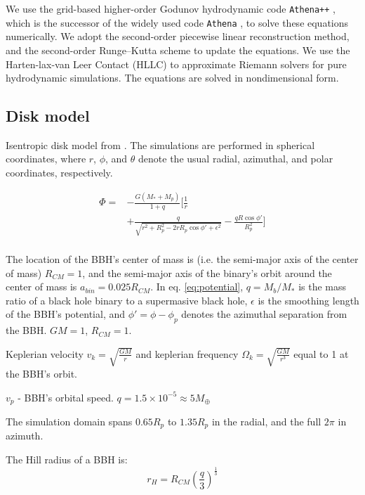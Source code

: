 \documentclass[twocolumn]{aastex631}
\begin{document}
We use the grid-based higher-order Godunov hydrodynamic code \texttt{Athena++} \citep{stone2020}, which is the successor of the 
widely used code \texttt{Athena} \citep{stone2008}, to solve these equations numerically. 
We adopt the second-order piecewise linear reconstruction method, and the second-order Runge–Kutta scheme to update the equations. 
We use the Harten-lax-van Leer Contact (HLLC) \citep{toro1994} to approximate Riemann solvers for pure hydrodynamic simulations. 
The equations are solved in nondimensional form. 

\subsection{Disk model}
Isentropic disk model from \citet{Fung_2017}.
The simulations are performed in spherical coordinates, where $r$, $\phi$, and $\theta$ denote the usual radial, azimuthal, and polar coordinates, respectively. 

\begin{equation}\label{eq:potential}
\begin{aligned}
     \Phi = & -\frac{G(M_*+M_p)}{1+q} \bigg[\frac{1}{r} \\
     & + \frac{q}{\sqrt{r^2+R_p^2-2rR_p\cos{\phi'}+\epsilon^2}} - \frac{qR\cos{\phi'}}{R_p^2}\bigg] \\
\end{aligned}
\end{equation}

The location of the BBH's center of mass is (i.e. the semi-major axis of the center of mass) $R_{CM} = 1$, and the semi-major axis of the 
binary's orbit around the center of mass is $a_{bin} = 0.025 R_{CM}$.
In eq. \ref{eq:potential}, $q = M_b/M_*$ is the mass ratio of a black hole binary to a supermasive black hole, 
$\epsilon$ is the smoothing length of the BBH's potential, and $\phi'= \phi-\phi_p$ denotes the azimuthal separation from the BBH. $GM=1$, $R_{CM}=1$.

Keplerian velocity $v_k=\sqrt{\frac{GM}{r}}$ and keplerian frequency $\Omega_k=\sqrt{\frac{GM}{r^3}}$ equal to 1 at the BBH's orbit.

$v_p$ - BBH's orbital speed. 
$q = 1.5\times 10^{-5} \approx 5 M_{\oplus}$

The simulation domain spans $0.65R_p$ to $1.35R_p$ in the radial, and the full $2\pi$ in azimuth.

The Hill radius of a BBH is:
\begin{equation}\label{eq:Hill}
    r_H=R_{CM}\left(\frac{q}{3}\right)^{\frac{1}{3}}
\end{equation}
\end{document}
